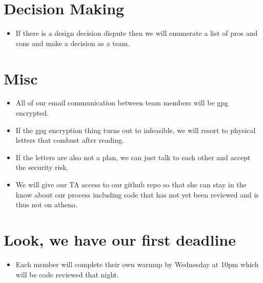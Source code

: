 \documentclass{article}
\begin{document}
\section{Decision Making}
\begin{itemize}
\item If there is a design decision dispute then we will enumerate a list of pros and cons and make a decision as a team.
\end{itemize}

\section{Misc}
\begin{itemize}
\item All of our email communication between team members will be gpg encrypted.
\item If the gpg encryption thing turns out to infeasible, we will resort to physical letters that combust after reading.
\item If the letters are also not a plan, we can just talk to each other and accept the security risk.
\item We will give our TA access to our github repo so that she can stay in the know about our process including code that has not yet been reviewed and is thus not on athena.
\end{itemize}

\section{Look, we have our first deadline}
\begin{itemize}
\item Each member will complete their own warmup by Wednesday at 10pm which will be code reviewed that night.
\end{itemize}
\end{document}
